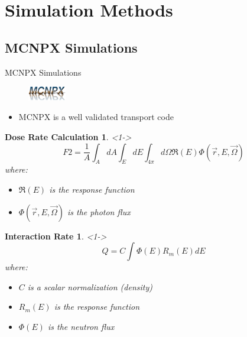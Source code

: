 
% 
%
\section{Simulation Methods}

\subsection{MCNPX Simulations}
\begin{frame}{MCNPX Simulations}
	\centering
	\begin{figure}
		\includegraphics[width=0.15\textwidth]{images/logo-mcnpx.eps}
	\end{figure}
\begin{itemize}
    \item MCNPX is a well validated transport code \cite{pelowitz_mcnpx_2010}
\end{itemize}
\tiny
    \newtheorem{thm10}{Dose Rate Calculation}
	\begin{thm10}<1->
		$$F2 = \frac{1}{A} \int_{A}{dA}\int_{E}{dE}\int_{4\pi}{d \Omega \Re(E) \Phi(\vec{r},E,\vec{\Omega})} $$
	where:
	\begin{itemize}
		\item $\Re(E)$ is the response function
		\item $\Phi(\vec{r},E,\vec{\Omega})$ is the photon flux
	\end{itemize}
	\end{thm10}
	\newtheorem{thm11}{Interaction Rate}
	\begin{thm11}<1->
		$$Q = C \int {\Phi(E) R_m(E) dE }$$
	where:
	\begin{itemize}
		\item $C$ is a scalar normalization (density)
		\item $R_m(E)$ is the response function
		\item $\Phi(E)$ is the neutron flux
	\end{itemize}
	\end{thm11}
\end{frame}


